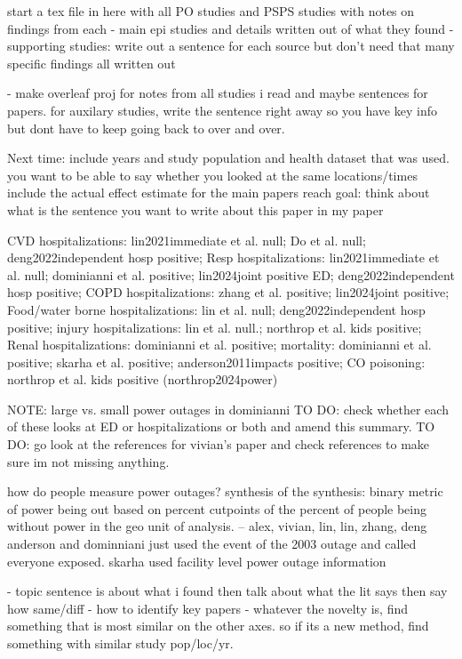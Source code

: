 start a tex file in here with all PO studies and PSPS studies with notes on findings from each 
- main epi studies and details written out of what they found 
- supporting studies: write out a sentence for each source but don't need that many specific findings all written out 

- make overleaf proj for notes from all studies i read and maybe sentences for papers. for auxilary studies, write the sentence right away so you have key info but dont have to keep going back to over and over. 


Next time: 
include years and study population and health dataset that was used. you want to be able to say whether you looked at the same locations/times
include the actual effect estimate for the main papers
reach goal: think about what is the sentence you want to write about this paper in my paper

CVD hospitalizations: lin2021immediate et al. null; Do et al. null; deng2022independent hosp positive; 
Resp hospitalizations: lin2021immediate et al. null; dominianni et al. positive; lin2024joint positive ED; deng2022independent hosp positive; 
COPD hospitalizations: zhang et al. positive; lin2024joint positive; 
Food/water borne hospitalizations: lin et al. null; deng2022independent hosp positive; 
injury hospitalizations: lin et al. null.; northrop et al. kids positive; 
Renal hospitalizations: dominianni et al. positive; 
mortality: dominianni et al. positive; skarha et al. positive; anderson2011impacts positive; 
CO poisoning: northrop et al. kids positive (northrop2024power)

NOTE: large vs. small power outages in dominianni 
TO DO: check whether each of these looks at ED or hospitalizations or both and amend this summary. 
TO DO: go look at the references for vivian's paper and check references to make sure im not missing anything. 

how do people measure power outages? synthesis of the synthesis: 
binary metric of power being out based on percent cutpoints of the percent of people being without power in the geo unit of analysis. -- alex, vivian, lin, lin, zhang, deng
anderson and dominniani just used the event of the 2003 outage and called everyone exposed. 
skarha used facility level power outage information 


- topic sentence is about what i found then talk about what the lit says then say how same/diff
- how to identify key papers 
- whatever the novelty is, find something that is most similar on the other axes. so if its a new method, find something with similar study pop/loc/yr. 



